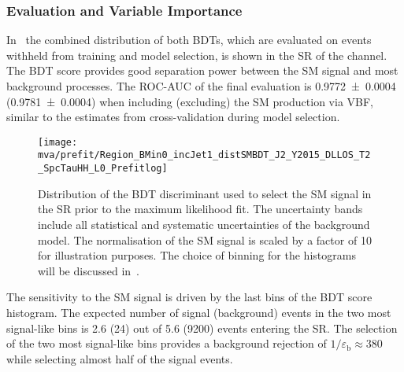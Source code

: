 \subsubsection{Evaluation and Variable Importance}%
\label{sec:bdt_performance}

In~ the combined distribution of both BDTs,
which are evaluated on events withheld from training and model
selection, is shown in the SR of the \hadhad channel. The
BDT score provides good separation power between the SM \HH signal and
most background processes. The ROC-AUC of the final evaluation is
\num{0.9772 +- 0.0004} (\num{0.9781 +- 0.0004}) when including
(excluding) the SM \HH production via VBF, similar to the estimates
from cross-validation during model selection.

\begin{figure}[htbp]
  \centering

  \texttt{[image: mva/prefit/Region\_BMin0\_incJet1\_distSMBDT\_J2\_Y2015\_DLLOS\_T2\_SpcTauHH\_L0\_Prefitlog]}

  \caption[Distribution of the BDT discriminant in the \hadhad SR.]{Distribution
    of the BDT discriminant used to select the SM \HH signal in the \hadhad SR
    prior to the maximum likelihood fit. The uncertainty bands include all
    statistical and systematic uncertainties of the background model. The
    normalisation of the SM \HH signal is scaled by a factor of 10 for
    illustration purposes. The choice of binning for the histograms will be
    discussed in~.}
  \label{fig:mva_smbdt_prefit}
\end{figure}

The sensitivity to the SM \HH signal is driven by the last bins of the
BDT score histogram.  The expected number of signal (background)
events in the two most signal-like bins is 2.6 (24) out of 5.6 (9200)
events entering the SR. The selection of the two most
signal-like bins provides a background rejection of
$1 / \varepsilon_{\text{b}} \approx 380$ while selecting almost half
of the signal events.

